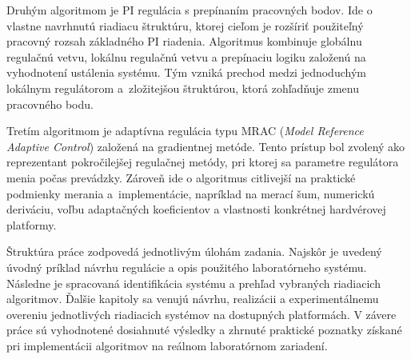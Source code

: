Druhým algoritmom je PI regulácia s prepínaním pracovných bodov. Ide o vlastne
navrhnutú riadiacu štruktúru, ktorej cieľom je rozšíriť použiteľný pracovný rozsah
základného PI riadenia. Algoritmus kombinuje globálnu regulačnú vetvu, lokálnu
regulačnú vetvu a prepínaciu logiku založenú na vyhodnotení ustálenia systému.
Tým vzniká prechod medzi jednoduchým lokálnym regulátorom a~zložitejšou
štruktúrou, ktorá zohľadňuje zmenu pracovného bodu.

Tretím algoritmom je adaptívna regulácia typu MRAC
(\emph{Model Reference Adaptive Control}) založená na gradientnej metóde.
Tento prístup bol zvolený ako reprezentant pokročilejšej regulačnej metódy,
pri ktorej sa parametre regulátora menia počas prevádzky. Zároveň ide
o algoritmus citlivejší na praktické podmienky merania a~implementácie,
napríklad na merací šum, numerickú deriváciu, voľbu adaptačných koeficientov
a vlastnosti konkrétnej hardvérovej platformy.

Štruktúra práce zodpovedá jednotlivým úlohám zadania. Najskôr je uvedený
úvodný príklad návrhu regulácie a opis použitého laboratórneho systému.
Následne je spracovaná identifikácia systému a prehľad vybraných riadiacich
algoritmov. Ďalšie kapitoly sa venujú návrhu, realizácii a experimentálnemu
overeniu jednotlivých riadiacich systémov na dostupných platformách. V závere
práce sú vyhodnotené dosiahnuté výsledky a zhrnuté praktické poznatky získané
pri implementácii algoritmov na reálnom laboratórnom zariadení.

\clearpage